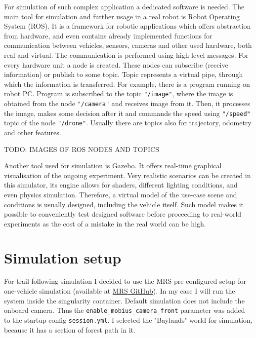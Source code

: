 For simulation of such complex application a dedicated software is needed. The main tool for simulation and further usage in a real robot is Robot Operating System (ROS). It is a framework for robotic applications which offers abstraction from hardware, and even contains already implemented functions for communication between vehicles, sensors, cameras and other used hardware, both real and virtual. 
The communication is performed using high-level messages. For every hardware unit a node is created. These nodes can subscribe (receive information) or publish to some topic. Topic represents a virtual pipe, through which the information is transferred. For example, there is a program running on robot PC. Program is subscribed to the topic \texttt{"/image"}, where the image is obtained from the node \texttt{"/camera"} and receives image from it. Then, it processes the image, makes some decision after it and commands the speed using \texttt{"/speed"} topic of the node \texttt{"/drone"}. Usually there are topics also for trajectory, odometry and other features.

TODO: IMAGES OF ROS NODES AND TOPICS

Another tool used for simulation is Gazebo. It offers real-time graphical visualisation of the ongoing experiment. Very realistic scenarios can be created in this simulator, its engine allows for shaders, different lighting conditions, and even physics simulation. Therefore, a virtual model of the use-case scene and conditions is usually designed, including the vehicle itself. Such model makes it possible to conveniently test designed software before proceeding to real-world experiments as the cost of a mistake in the real world can be high. 

\section{Simulation setup}

For trail following simulation I decided to use the \acs{MRS} pre-configured setup for one-vehicle simulation (available at \href{https://github.com/ctu-mrs/simulation}{\acs{MRS} GitHub}). In my case I will run the system inside the singularity container. Default simulation does not include the onboard camera. Thus the \newline \texttt{enable\_mobius\_camera\_front} parameter was added to the startup config \texttt{session.yml}. I selected the "Baylands" world for simulation, because it has a section of forest path in it. 

